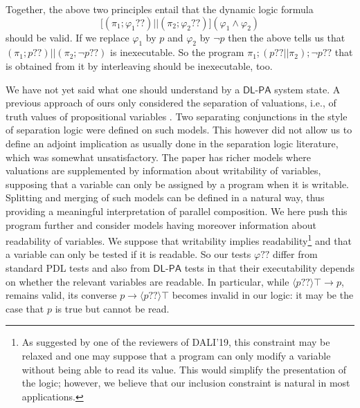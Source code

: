 \documentclass{llncs}
\newcommand{\pll}{ {||} }							%
\newcommand{\testendo}{?\!\!?}			%
\newcommand{\Dlpa}{\ensuremath{\mathsf{DL\text{-}PA}}\xspace}
\newcommand{\ah}[1]{\footnote{\textbf{AH:} #1}}
\newcommand{\lbox}[1]{ \big[ #1 \big] }
\newcommand{\ldia}[1]{ \big\langle #1 \big\rangle}
\newcommand{\limp}{ \rightarrow }
\renewcommand{\phi}{\varphi}
\begin{document}
Together, the above two principles entail that the dynamic logic formula
$$ \lbox{ (\pi_1 ; \phi_1 \testendo ) \pll (\pi_2 ; \phi_2 \testendo ) } (\phi_1 \land \phi_2) $$
should be valid. 
If we replace $\phi_1$ by $p$ and $\phi_2$ by $\lnot p$ then the above tells us that 
$(\pi_1 ; p \testendo ) \pll (\pi_2 ; \lnot p \testendo )$ is inexecutable. 
So the program
$\pi_1 ; (p \testendo \pll \pi_2) ; \lnot p \testendo $ 
that is obtained from it by interleaving should be inexecutable, too. 

We have not yet said what one should understand by a \Dlpa system state. 
A previous approach of ours only considered the separation of valuations, i.e., 
of truth values of propositional variables \cite{Herzig-Wollic13}. 
Two separating conjunctions in the style of separation logic were defined on such models. 
This however did not allow us to define an adjoint implication as usually done in the separation logic literature, which was somewhat unsatisfactory. 
The paper \cite{HerzigEtal-Ijcai19} has richer models where valuations are supplemented by information about writability of variables, 
supposing that a variable can only be assigned by a program when it is writable. 
Splitting and merging of such models can be defined in a natural way, thus providing a meaningful interpretation of parallel composition. 
We here push this program further and consider models having moreover information about readability of variables. 
We suppose that writability implies readability\footnote{%
As suggested by one of the reviewers of DALI'19, this constraint may be relaxed 
and one may suppose that a program can only modify a variable without being able to read its value. 
This would simplify the presentation of the logic; however, we believe that our inclusion constraint is natural in most applications.
}
and that a variable can only be tested if it is readable. 
So our tests $\phi \testendo$ differ from standard PDL tests and also from \Dlpa tests in that their 
executability depends on whether the relevant variables are readable. In particular, while 
$\ldia{ p \testendo } \top \limp p$, remains valid, its converse
$p \limp \ldia{ p \testendo } \top $ becomes invalid in our logic: 
it may be the case that $p$ is true but cannot be read.
\end{document}
